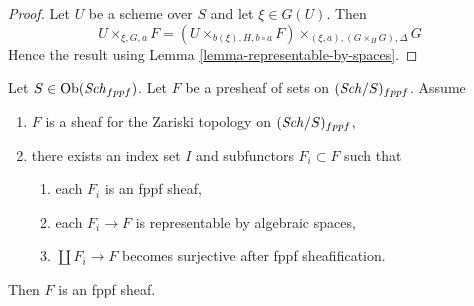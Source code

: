 \begin{proof}
Let $U$ be a scheme over $S$ and let $\xi \in G(U)$. Then
$$
U \times_{\xi, G, a} F =
(U \times_{b(\xi), H, b \circ a} F) \times_{(\xi, a), (G \times_H G), \Delta} G
$$
Hence the result using Lemma \ref{lemma-representable-by-spaces}.
\end{proof}

\begin{lemma}
\label{lemma-glueing-sheaves}
Let $S \in \mathop{\mathrm{Ob}}\nolimits(\mathit{Sch}_{fppf})$. Let $F$ be a presheaf of sets on
$(\mathit{Sch}/S)_{fppf}$. Assume
\begin{enumerate}
\item $F$ is a sheaf for the Zariski topology on $(\mathit{Sch}/S)_{fppf}$,
\item there exists an index set $I$ and subfunctors $F_i \subset F$ such that
\begin{enumerate}
\item each $F_i$ is an fppf sheaf,
\item each $F_i \to F$ is representable by algebraic spaces,
\item $\coprod F_i \to F$ becomes surjective after fppf sheafification.
\end{enumerate}
\end{enumerate}
Then $F$ is an fppf sheaf.
\end{lemma}

